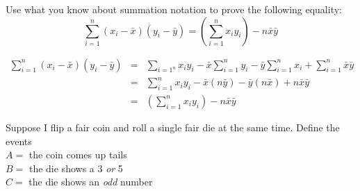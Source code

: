 \documentclass[addpoints,12pt]{exam}
\begin{document}
\begin{questions}





\question[10] Use what you know about summation notation to prove the following equality:
  $$\sum_{i=1}^n (x_i - \bar{x}) (y_i - \bar{y}) = \left(\sum_{i=1}^n x_i y_i\right) - n\bar{x}\bar{y} $$ 
  \begin{solution}[2in]
    \begin{eqnarray*}
      \sum_{i=1}^n (x_i - \bar{x}) (y_i - \bar{y}) &=& \sum_{i=1^n}x_i y_i - \bar{x}\sum_{i=1}^n y_i - \bar{y} \sum_{i=1}^n x_i + \sum_{i=1}^n\bar{x}\bar{y}\\
      &=& \sum_{i=1}^n x_i y_i - \bar{x}(n\bar{y}) - \bar{y} (n\bar{x}) + n\bar{x}\bar{y}\\
  &=& \left(\sum_{i=1}^n x_i y_i\right) - n\bar{x}\bar{y}
    \end{eqnarray*}
  \end{solution}





\question Suppose I flip a fair coin and roll a single fair die at the same time. Define the events 
\\ $A =$ the coin comes up tails 
\\ $B =$ the die shows a 3 \emph{or} 5
\\ $C =$ the die shows an \emph{odd} number 
 	\begin{parts} 

\end{parts}
\end{questions}
\end{document}

